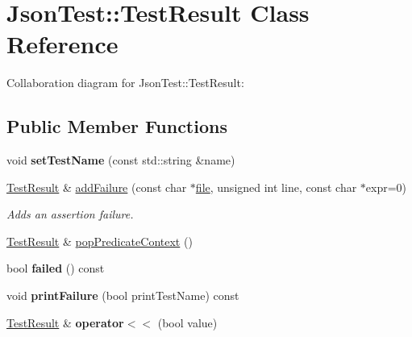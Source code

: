 \hypertarget{class_json_test_1_1_test_result}{\section{Json\+Test\+:\+:Test\+Result Class Reference}
\label{class_json_test_1_1_test_result}
}


Collaboration diagram for Json\+Test\+:\+:Test\+Result\+:
\subsection*{Public Member Functions}
\begin{DoxyCompactItemize}
\item 
\hypertarget{class_json_test_1_1_test_result_a0669e257ac54a94369a7d73feba20a12}{void {\bfseries set\+Test\+Name} (const std\+::string \&name)}\label{class_json_test_1_1_test_result_a0669e257ac54a94369a7d73feba20a12}

\item 
\hyperlink{class_json_test_1_1_test_result}{Test\+Result} \& \hyperlink{class_json_test_1_1_test_result_a87da4436f1bd56e4c83da70c84494568}{add\+Failure} (const char $\ast$\hyperlink{structfile}{file}, unsigned int line, const char $\ast$expr=0)
\begin{DoxyCompactList}\small\item\em Adds an assertion failure. \end{DoxyCompactList}\item 
\hyperlink{class_json_test_1_1_test_result}{Test\+Result} \& \hyperlink{class_json_test_1_1_test_result_ae89229d89dcbfaba2e9b06f358459b1e}{pop\+Predicate\+Context} ()
\item 
\hypertarget{class_json_test_1_1_test_result_ac3f37939ca7533f6eb2bf5b2aa3a875e}{bool {\bfseries failed} () const }\label{class_json_test_1_1_test_result_ac3f37939ca7533f6eb2bf5b2aa3a875e}

\item 
\hypertarget{class_json_test_1_1_test_result_a664d7cad53c28ba34f69269e046913c9}{void {\bfseries print\+Failure} (bool print\+Test\+Name) const }\label{class_json_test_1_1_test_result_a664d7cad53c28ba34f69269e046913c9}

\item 
\hypertarget{class_json_test_1_1_test_result_ac7c76f5e0a597f4adfded55df3a76a41}{\hyperlink{class_json_test_1_1_test_result}{Test\+Result} \& {\bfseries operator$<$$<$} (bool value)}\label{class_json_test_1_1_test_result_ac7c76f5e0a597f4adfded55df3a76a41}


\end{DoxyCompactItemize}
